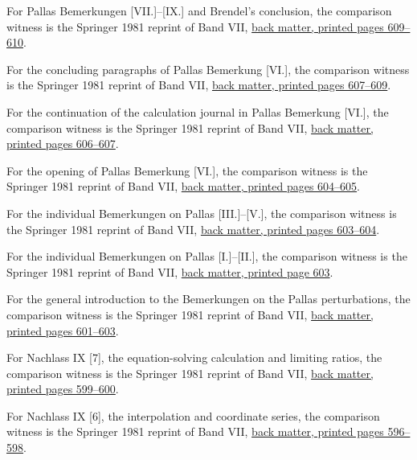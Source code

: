 For Pallas Bemerkungen [VII.]--[IX.] and Brendel’s conclusion, the comparison witness is the Springer 1981 reprint of Band VII, \href{https://link.springer.com/content/pdf/bbm:978-3-642-92478-1/1}{back matter, printed pages 609--610}.



For the concluding paragraphs of Pallas Bemerkung [VI.], the comparison witness is the Springer 1981 reprint of Band VII, \href{https://link.springer.com/content/pdf/bbm:978-3-642-92478-1/1}{back matter, printed pages 607--609}.



For the continuation of the calculation journal in Pallas Bemerkung [VI.], the comparison witness is the Springer 1981 reprint of Band VII, \href{https://link.springer.com/content/pdf/bbm:978-3-642-92478-1/1}{back matter, printed pages 606--607}.



For the opening of Pallas Bemerkung [VI.], the comparison witness is the Springer 1981 reprint of Band VII, \href{https://link.springer.com/content/pdf/bbm:978-3-642-92478-1/1}{back matter, printed pages 604--605}.



For the individual Bemerkungen on Pallas [III.]–[V.], the comparison witness is the Springer 1981 reprint of Band VII, \href{https://link.springer.com/content/pdf/bbm:978-3-642-92478-1/1}{back matter, printed pages 603--604}.



For the individual Bemerkungen on Pallas [I.]–[II.], the comparison witness is the Springer 1981 reprint of Band VII, \href{https://link.springer.com/content/pdf/bbm:978-3-642-92478-1/1}{back matter, printed page 603}.



For the general introduction to the Bemerkungen on the Pallas perturbations, the comparison witness is the Springer 1981 reprint of Band VII, \href{https://link.springer.com/content/pdf/bbm:978-3-642-92478-1/1}{back matter, printed pages 601--603}.



For Nachlass IX [7], the equation-solving calculation and limiting ratios, the comparison witness is the Springer 1981 reprint of Band VII, \href{https://link.springer.com/content/pdf/bbm:978-3-642-92478-1/1}{back matter, printed pages 599--600}.



For Nachlass IX [6], the interpolation and coordinate series, the comparison witness is the Springer 1981 reprint of Band VII, \href{https://link.springer.com/content/pdf/bbm:978-3-642-92478-1/1}{back matter, printed pages 596--598}.




